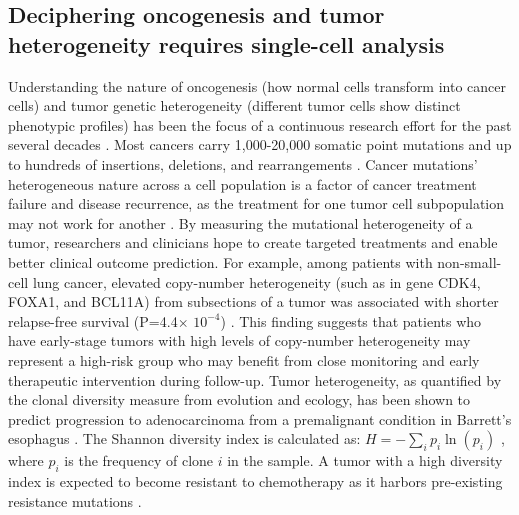 \subsection{Deciphering oncogenesis and tumor heterogeneity requires single-cell analysis}
Understanding the nature of oncogenesis (how normal cells transform into cancer cells) and tumor genetic heterogeneity (different tumor cells show distinct phenotypic profiles) has been the focus of a continuous research effort for the past several decades \cite{Navin:2011jq,Nowell:1976ul,Tsujimoto:1984ti,Heppner:1984ve,Sebat:2004kp,Carter:2012fn}. Most cancers carry 1,000-20,000 somatic point mutations and up to hundreds of insertions, deletions, and rearrangements \cite{VOGELSTEIN:2013en,Martincorena:2015ki}. Cancer mutations' heterogeneous nature across a cell population is a factor of cancer treatment failure and disease recurrence, as the treatment for one tumor cell subpopulation may not work for another \cite{Saadatpour:2015kn,Bedard:2013ww}. By measuring the mutational heterogeneity of a tumor, researchers and clinicians hope to create targeted treatments and enable better clinical outcome prediction. For example, among patients with non-small-cell lung cancer, elevated copy-number heterogeneity (such as in gene CDK4, FOXA1, and BCL11A) from subsections of a tumor was associated with shorter relapse-free survival (P=4.4$\times$ $10^{-4}$) \cite{JamalHanjani:2017cla}. This finding suggests that patients who have early-stage tumors with high levels of copy-number heterogeneity may represent a high-risk group who may benefit from close monitoring and early therapeutic intervention during follow-up. Tumor heterogeneity, as quantified by the clonal diversity measure from evolution and ecology, has been shown to predict progression to adenocarcinoma from a premalignant condition in Barrett's esophagus \cite{Maley:2006dd}. The Shannon diversity index is calculated as: $H = - \sum_i p_i \ln{(p_i)}$ , where $p_i$ is the frequency of clone $i$ in the sample. A tumor with a high diversity index is expected to become resistant to chemotherapy as it harbors pre-existing resistance mutations \cite{Navin:2014cm}. 

